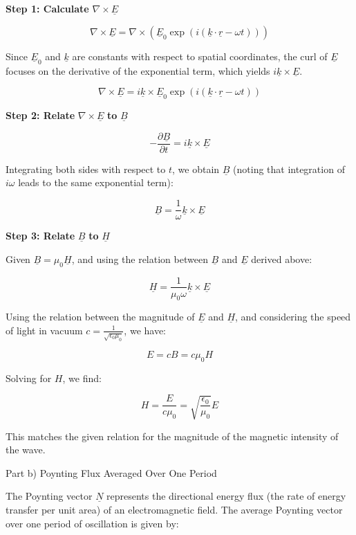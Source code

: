 \textbf{Step 1: Calculate} \(\nabla \times \underline{E}\)

\[
\nabla \times \underline{E} = \nabla \times (\underline{E}_{0} \exp(i(\underline{k} \cdot \underline{r} - \omega t)))
\]

Since \(\underline{E}_{0}\) and \(\underline{k}\) are constants with respect to spatial coordinates, the curl of \(\underline{E}\) focuses on the derivative of the exponential term, which yields \(i\underline{k} \times \underline{E}\).

\[
\nabla \times \underline{E} = i\underline{k} \times \underline{E}_{0} \exp(i(\underline{k} \cdot \underline{r} - \omega t))
\]

\textbf{Step 2: Relate} \(\nabla \times \underline{E}\) \textbf{to} \(\underline{B}\)

\[
- \frac{\partial \underline{B}}{\partial t} = i\underline{k} \times \underline{E}
\]

Integrating both sides with respect to \(t\), we obtain \(\underline{B}\) (noting that integration of \(i\omega\) leads to the same exponential term):

\[
\underline{B} = \frac{1}{\omega} \underline{k} \times \underline{E}
\]

\textbf{Step 3: Relate} \(\underline{B}\) \textbf{to} \(\underline{H}\)

Given \(\underline{B} = \mu_{0} \underline{H}\), and using the relation between \(\underline{B}\) and \(\underline{E}\) derived above:

\[
\underline{H} = \frac{1}{\mu_{0}\omega} \underline{k} \times \underline{E}
\]

Using the relation between the magnitude of \(\underline{E}\) and \(\underline{H}\), and considering the speed of light in vacuum \(c = \frac{1}{\sqrt{\epsilon_{0}\mu_{0}}}\), we have:

\[
E = cB = c\mu_{0}H
\]

Solving for \(H\), we find:

\[
H = \frac{E}{c\mu_{0}} = \sqrt{\frac{\epsilon_{0}}{\mu_{0}}} E
\]

This matches the given relation for the magnitude of the magnetic intensity of the wave.

Part b) Poynting Flux Averaged Over One Period

The Poynting vector \(\underline{N}\) represents the directional energy flux (the rate of energy transfer per unit area) of an electromagnetic field. The average Poynting vector over one period of oscillation is given by:

